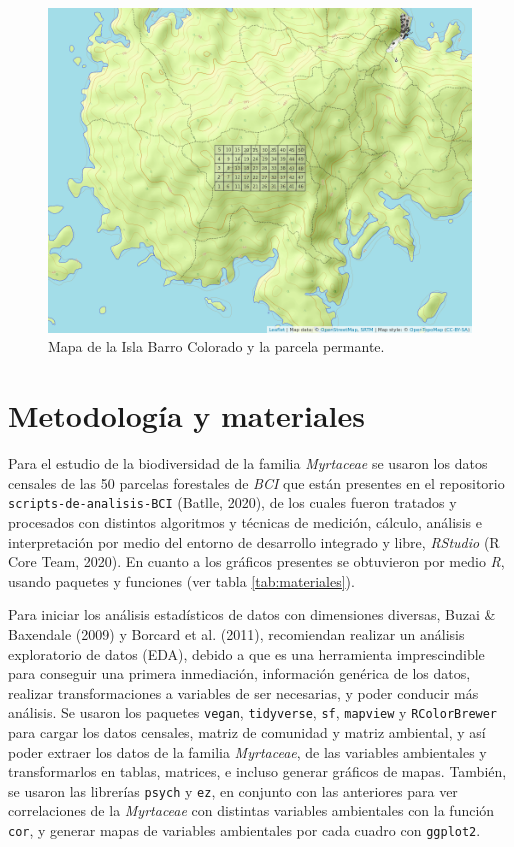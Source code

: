 \documentclass[11pt,]{article}
\begin{document}
\begin{figure}
\centering
\includegraphics[width=1.00000\textwidth]{mapa_cuadros2.png}
\caption{Mapa de la Isla Barro Colorado y la parcela
permante.\label{fig:bci_map}}
\end{figure}

\section{Metodología y materiales}\label{metodologuxeda-y-materiales}

Para el estudio de la biodiversidad de la familia \emph{Myrtaceae} se
usaron los datos censales de las 50 parcelas forestales de \emph{BCI}
que están presentes en el repositorio \texttt{scripts-de-analisis-BCI}
(Batlle, 2020), de los cuales fueron tratados y procesados con distintos
algoritmos y técnicas de medición, cálculo, análisis e interpretación
por medio del entorno de desarrollo integrado y libre, \emph{RStudio} (R
Core Team, 2020). En cuanto a los gráficos presentes se obtuvieron por
medio \emph{R}, usando paquetes y funciones (ver tabla
\ref{tab:materiales}).

Para iniciar los análisis estadísticos de datos con dimensiones
diversas, Buzai \& Baxendale (2009) y Borcard et al. (2011), recomiendan
realizar un análisis exploratorio de datos (EDA), debido a que es una
herramienta imprescindible para conseguir una primera inmediación,
información genérica de los datos, realizar transformaciones a variables
de ser necesarias, y poder conducir más análisis. Se usaron los paquetes
\texttt{vegan}, \texttt{tidyverse}, \texttt{sf}, \texttt{mapview} y
\texttt{RColorBrewer} para cargar los datos censales, matriz de
comunidad y matriz ambiental, y así poder extraer los datos de la
familia \emph{Myrtaceae}, de las variables ambientales y transformarlos
en tablas, matrices, e incluso generar gráficos de mapas. También, se
usaron las librerías \texttt{psych} y \texttt{ez}, en conjunto con las
anteriores para ver correlaciones de la \emph{Myrtaceae} con distintas
variables ambientales con la función \texttt{cor}, y generar mapas de
variables ambientales por cada cuadro con \texttt{ggplot2}.
\end{document}
